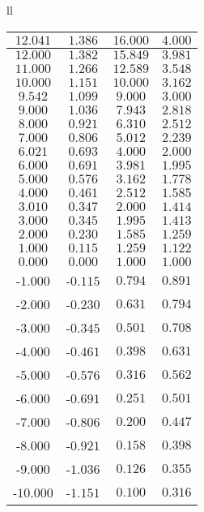 \begin{tabular}{ll}
{\begin{tabular}{|c|c|c|c|}
    \textbf{$12.041$} & $1.386$ & \textbf{$16.000$} & \textbf{$4.000$} \\ \hline
    \textbf{$12.000$} & $1.382$ & $15.849$ & $3.981$ \\ \hline
    $11.000$ & $1.266$ & $12.589$ & $3.548$ \\ \hline
    \textbf{$10.000$} & $1.151$ & \textbf{$10.000$} & $3.162$ \\ \hline
    $9.542$ & $1.099$ & $9.000$ & $3.000$ \\ \hline
    $9.000$ & $1.036$ & $7.943$ & $2.818$ \\ \hline
    $8.000$ & $0.921$ & $6.310$ & $2.512$ \\ \hline
    $7.000$ & $0.806$ & $5.012$ & $2.239$ \\ \hline
    \textbf{$6.021$} & \textbf{$0.693$} & \textbf{$4.000$} & \textbf{$2.000$} \\ \hline
    $6.000$ & $0.691$ & $3.981$ & $1.995$ \\ \hline
    $5.000$ & $0.576$ & $3.162$ & $1.778$ \\ \hline
    $4.000$ & $0.461$ & $2.512$ & $1.585$ \\ \hline
    \textbf{$3.010$} & \textbf{$0.347$} & \textbf{$2.000$} & \textbf{$1.414$} \\ \hline
    $3.000$ & $0.345$ & $1.995$ & $1.413$ \\ \hline
    $2.000$ & $0.230$ & $1.585$ & $1.259$ \\ \hline
    $1.000$ & $0.115$ & $1.259$ & $1.122$ \\ \hline
    $0.000$ & $0.000$ & $1.000$ & $1.000$ \\ \hline
    -$1.000$ & -$0.115$ & $0.794$ & $0.891$ \\ \hline
    -$2.000$ & -$0.230$ & $0.631$ & $0.794$ \\ \hline
    -$3.000$ & -$0.345$ & $0.501$ & $0.708$ \\ \hline
    -$4.000$ & -$0.461$ & $0.398$ & $0.631$ \\ \hline
    -$5.000$ & -$0.576$ & $0.316$ & $0.562$ \\ \hline
    -$6.000$ & -$0.691$ & $0.251$ & $0.501$ \\ \hline
    -$7.000$ & -$0.806$ & $0.200$ & $0.447$ \\ \hline
    -$8.000$ & -$0.921$ & $0.158$ & $0.398$ \\ \hline
    -$9.000$ & -$1.036$ & $0.126$ & $0.355$ \\ \hline
    -$10.000$ & -$1.151$ & $0.100$ & $0.316$ \\ \hline

\end{tabular}}
\end{tabular}
